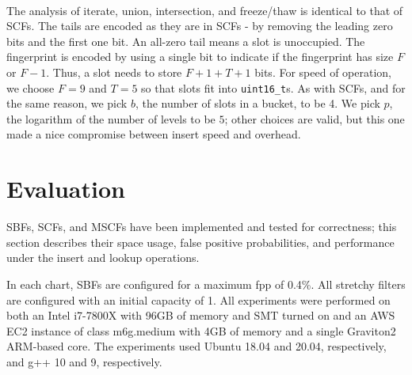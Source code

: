 \documentclass[letterpaper,twocolumn,10pt]{article}
\newcommand{\taffy}{stretchy}
\newcommand{\TBF}{SBF}
\newcommand{\TCF}{SCF}
\newcommand{\MTCF}{MSCF}
\newcommand{\taffy}{taffy}
\newcommand{\TBF}{TBF}
\newcommand{\TCF}{TCF}
\newcommand{\MTCF}{MTCF}
\begin{document}
\paragraph{}
The analysis of iterate, union, intersection, and freeze/thaw is identical to that of \TCF{}s.
The tails are encoded as they are in \TCF{}s - by removing the leading zero bits and the first one bit.
An all-zero tail means a slot is unoccupied.
The fingerprint is encoded by using a single bit to indicate if the fingerprint has size $F$ or $F-1$.
Thus, a slot needs to store $F + 1 + T + 1$ bits.
For speed of operation, we choose $F = 9$ and $T = 5$ so that slots fit into {\tt uint16\_t}s.
As with \TCF{}s, and for the same reason, we pick $b$, the number of slots in a bucket, to be 4.
We pick $p$, the logarithm of the number of levels to be $5$; other choices are valid, but this one made a nice compromise between insert speed and overhead.



\section{Evaluation}
\label{eval}


\TBF{}s, \TCF{}s, and \MTCF{}s have been implemented and tested for correctness; this section describes their space usage, false positive probabilities, and performance under the insert and lookup operations.

In each chart, \TBF{}s are configured for a maximum fpp of 0.4\%.
All \taffy{} filters are configured with an initial capacity of 1. %
All experiments were performed on both an Intel i7-7800X with 96GB of memory and SMT turned on and an AWS EC2 instance of class m6g.medium with 4GB of memory and a single Graviton2 ARM-based core.
The experiments used Ubuntu 18.04 and 20.04, respectively, and g++ 10 and 9, respectively.
\end{document}
